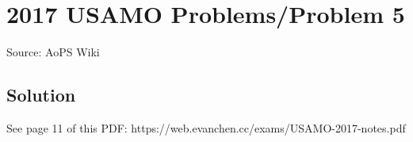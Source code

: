 \documentclass[12pt]{article}
\begin{document}
\section*{{2017 USAMO Problems/Problem 5}}
Source: AoPS Wiki

\subsection*{Solution}
See page 11 of this PDF: https://web.evanchen.cc/exams/USAMO-2017-notes.pdf
\end{document}
